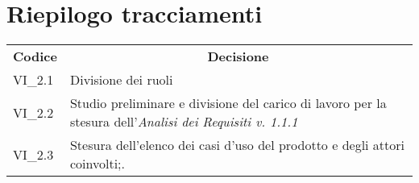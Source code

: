 
\section{Riepilogo tracciamenti}
\begin{longtable} {
		>{\centering}p{17mm} 
		>{}p{120mm}}
	\rowcolor{gray!50}
	\textbf{Codice} & \multicolumn{1}{c}{\textbf{Decisione}} \\%
	VI\_2.1 & Divisione dei ruoli \TBstrut \\ [2mm]
	VI\_2.2 & Studio preliminare e divisione del carico di lavoro per la stesura dell'\textit{Analisi dei Requisiti v. 1.1.1} \TBstrut \\ [2mm]
	VI\_2.3 & Stesura dell'elenco dei casi d'uso del prodotto e degli attori coinvolti;. \TBstrut \\ [2mm]
	
\end{longtable}